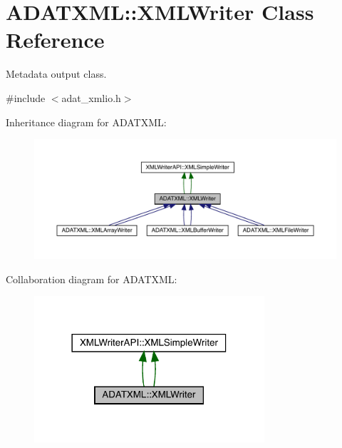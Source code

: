 \hypertarget{classADATXML_1_1XMLWriter}{}\section{A\+D\+A\+T\+X\+ML\+:\+:X\+M\+L\+Writer Class Reference}
\label{classADATXML_1_1XMLWriter}


Metadata output class.  




{\ttfamily \#include $<$adat\+\_\+xmlio.\+h$>$}



Inheritance diagram for A\+D\+A\+T\+X\+ML\+:\nopagebreak
\begin{figure}[H]
\begin{center}
\leavevmode
\includegraphics[width=350pt]{dd/d9f/classADATXML_1_1XMLWriter__inherit__graph}
\end{center}
\end{figure}


Collaboration diagram for A\+D\+A\+T\+X\+ML\+:\nopagebreak
\begin{figure}[H]
\begin{center}
\leavevmode
\includegraphics[width=242pt]{df/d4f/classADATXML_1_1XMLWriter__coll__graph}
\end{center}
\end{figure}

